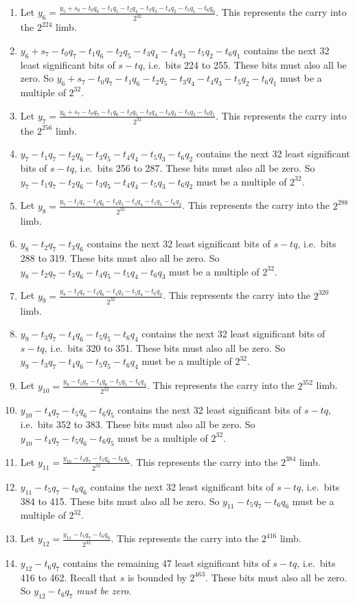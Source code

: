 \documentclass[a4paper, 12pt]{article}
\begin{document}
\begin{enumerate}
  \item Let $y_6 = \frac{y_5+s_6-t_0q_6-t_1q_5-t_2q_4-t_3q_3-t_4q_2-t_5q_1-t_6q_0}{2^{32}}$. This represents the carry into the $2^{224}$ limb.
  \item $y_6+s_7-t_0q_7-t_1q_6-t_2q_5-t_3q_4-t_4q_3-t_5q_2-t_6q_1$ contains the next 32 least significant bits of $s-tq$, i.e.~bits 224 to 255. These bits must also all be zero. So $y_6+s_7-t_0q_7-t_1q_6-t_2q_5-t_3q_4-t_4q_3-t_5q_2-t_6q_1$ must be a multiple of $2^{32}$.
  \item Let $y_7 = \frac{y_6+s_7-t_0q_7-t_1q_6-t_2q_5-t_3q_4-t_4q_3-t_5q_2-t_6q_1}{2^{32}}$. This represents the carry into the $2^{256}$ limb.
  \item $y_7-t_1q_7-t_2q_6-t_3q_5-t_4q_4-t_5q_3-t_6q_2$ contains the next 32 least significant bits of $s-tq$, i.e.~bits 256 to 287. These bits must also all be zero. So $y_7-t_1q_7-t_2q_6-t_3q_5-t_4q_4-t_5q_3-t_6q_2$ must be a multiple of $2^{32}$.
  \item Let $y_8 = \frac{y_7-t_1q_7-t_2q_6-t_3q_5-t_4q_4-t_5q_3-t_6q_2}{2^{32}}$. This represents the carry into the $2^{288}$ limb.
  \item $y_8-t_2q_7-t_3q_6$ contains the next 32 least significant bits of $s-tq$, i.e.~bits 288 to 319. These bits must also all be zero. So $y_8-t_2q_7-t_3q_6-t_4q_5-t_5q_4-t_6q_3$ must be a multiple of $2^{32}$.
  \item Let $y_9 = \frac{y_8-t_2q_7-t_3q_6-t_4q_5-t_5q_4-t_6q_3}{2^{32}}$. This represents the carry into the $2^{320}$ limb.
  \item $y_9-t_3q_7-t_4q_6-t_5q_5-t_6q_4$ contains the next 32 least significant bits of $s-tq$, i.e.~bits 320 to 351. These bits must also all be zero. So $y_9-t_3q_7-t_4q_6-t_5q_5-t_6q_4$ must be a multiple of $2^{32}$.
  \item Let $y_{10} = \frac{y_9-t_3q_7-t_4q_6-t_5q_5-t_6q_4}{2^{32}}$. This represents the carry into the $2^{352}$ limb.
  \item $y_{10}-t_4q_7-t_5q_6-t_6q_5$ contains the next 32 least significant bits of $s-tq$, i.e.~bits 352 to 383. These bits must also all be zero. So $y_{10}-t_4q_7-t_5q_6-t_6q_5$ must be a multiple of $2^{32}$.
  \item Let $y_{11} = \frac{y_{10}-t_4q_7-t_5q_6-t_6q_5}{2^{32}}$. This represents the carry into the $2^{384}$ limb.
  \item $y_{11}-t_5q_7-t_6q_6$ contains the next 32 least significant bits of $s-tq$, i.e.~bits 384 to 415. These bits must also all be zero. So $y_{11}-t_5q_7-t_6q_6$ must be a multiple of $2^{32}$.
  \item Let $y_{12} = \frac{y_{11}-t_5q_7-t_6q_6}{2^{32}}$. This represents the carry into the $2^{416}$ limb.
  \item $y_{12}-t_6q_7$ contains the remaining 47 least significant bits of $s-tq$, i.e.~bits 416 to 462. Recall that $s$ is bounded by $2^{463}$. These bits must also all be zero. So $y_{12}-t_6q_7$ \textit{must be zero}.
\end{enumerate}
\end{document}
